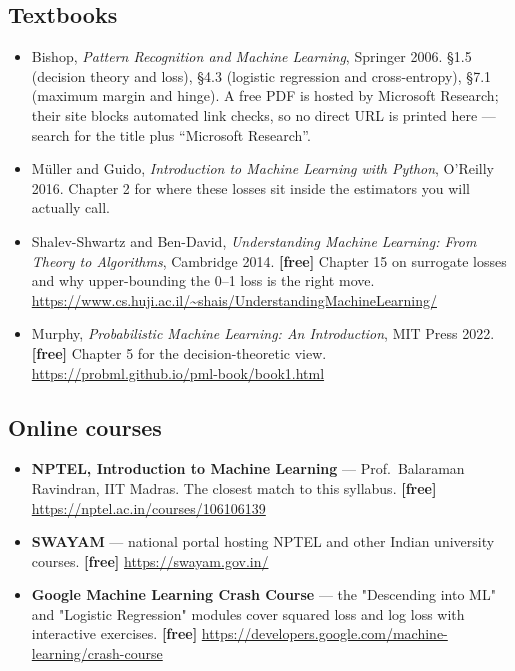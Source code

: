 \documentclass[11pt]{article}
\begin{document}
\subsection*{Textbooks}

\begin{itemize}[leftmargin=*]
  \item Bishop, \emph{Pattern Recognition and Machine Learning}, Springer 2006.
    \S1.5 (decision theory and loss), \S4.3 (logistic regression and
    cross-entropy), \S7.1 (maximum margin and hinge). A free PDF is hosted by
    Microsoft Research; their site blocks automated link checks, so no direct
    URL is printed here --- search for the title plus ``Microsoft Research''.
  \item M\"uller and Guido, \emph{Introduction to Machine Learning with Python},
    O'Reilly 2016. Chapter 2 for where these losses sit inside the estimators
    you will actually call.
  \item Shalev-Shwartz and Ben-David, \emph{Understanding Machine Learning:
    From Theory to Algorithms}, Cambridge 2014. \textbf{[free]} Chapter 15 on
    surrogate losses and why upper-bounding the 0--1 loss is the right move.
    \url{https://www.cs.huji.ac.il/~shais/UnderstandingMachineLearning/}
  \item Murphy, \emph{Probabilistic Machine Learning: An Introduction},
    MIT Press 2022. \textbf{[free]} Chapter 5 for the decision-theoretic view.
    \url{https://probml.github.io/pml-book/book1.html}
\end{itemize}

\subsection*{Online courses}

\begin{itemize}[leftmargin=*]
  \item \textbf{NPTEL, Introduction to Machine Learning} --- Prof.\ Balaraman
    Ravindran, IIT Madras. The closest match to this syllabus.
    \textbf{[free]} \url{https://nptel.ac.in/courses/106106139}
  \item \textbf{SWAYAM} --- national portal hosting NPTEL and other Indian
    university courses. \textbf{[free]} \url{https://swayam.gov.in/}
  \item \textbf{Google Machine Learning Crash Course} --- the "Descending into
    ML" and "Logistic Regression" modules cover squared loss and log loss with
    interactive exercises. \textbf{[free]}
    \url{https://developers.google.com/machine-learning/crash-course}
\end{itemize}
\end{document}
